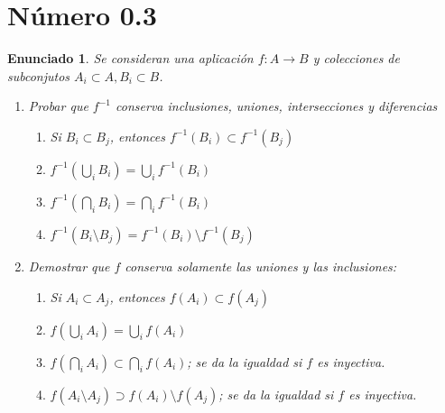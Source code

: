 \documentclass[10pt,a4paper,openright]{book}
\theoremstyle{break}
\newtheorem*{enun}{Enunciado}
\begin{document}
\section{Número 0.3}
\begin{enun}
Se consideran una aplicación $f: A \rightarrow B$ y colecciones de subconjutos $A_i \subset A, B_i \subset B$.
\begin{enumerate}[label={(\arabic*)}]
 \item Probar que $f^{-1}$ conserva inclusiones, uniones, intersecciones y diferencias
 \begin{enumerate}[label={(\alph*)}]
 \item Si $B_i \subset B_j$, entonces $f^{-1} (B_i) \subset f^{-1}(B_j)$
 \item $f^{-1}  (\bigcup_i B_i) = \bigcup_i f^{-1} (B_i)$
 \item $f^{-1}  (\bigcap_i B_i) = \bigcap_i f^{-1} (B_i)$
 \item $f^{-1} (B_i \setminus B_j) = f^{-1}(B_i) \setminus f^{-1}(B_j)$
 \end{enumerate}
 \item Demostrar que $f$ conserva solamente las uniones y las inclusiones:
 \begin{enumerate}[label={(\alph*)}]
 \item Si $A_i \subset A_j$, entonces $f (A_i) \subset f(A_j)$
 \item $f(\bigcup_i A_i) = \bigcup_i f (A_i)$
 \item $f  (\bigcap_i A_i) \subset \bigcap_i f(A_i)$; se da la igualdad si $f$ es inyectiva.
 \item $f (A_i \setminus A_j) \supset f(A_i) \setminus f(A_j)$; se da la igualdad si $f$ es inyectiva.
 \end{enumerate}
\end{enumerate}
\end{enun}
\end{document}
